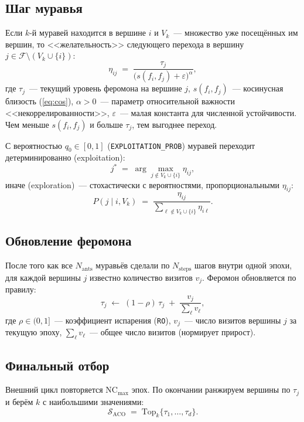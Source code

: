 \documentclass[12pt,a4paper]{article}
\begin{document}
\subsection{Шаг муравья}
Если $k$-й муравей находится в вершине $i$ и $V_k$~--- множество уже
посещённых им вершин, то <<желательность>> следующего перехода в
вершину $j \in \mathcal{F} \setminus (V_k \cup \{i\})$:
\begin{equation}
  \eta_{ij} \;=\; \frac{\tau_j}{\bigl(s(f_i, f_j) + \varepsilon\bigr)^{\alpha}},
  \label{eq:eta}
\end{equation}
где $\tau_j$~--- текущий уровень феромона на вершине $j$,
$s(f_i, f_j)$~--- косинусная близость (\ref{eq:cos}),
$\alpha > 0$~--- параметр относительной важности
<<некоррелированности>>,
$\varepsilon$~--- малая константа для численной устойчивости.
Чем меньше $s(f_i,f_j)$ и больше $\tau_j$, тем выгоднее переход.

С вероятностью $q_0 \in [0,1]$ (\texttt{EXPLOITATION\_PROB}) муравей
переходит детерминированно (exploitation):
\begin{equation}
  j^* \;=\; \arg\max_{j \notin V_k \cup \{i\}} \eta_{ij},
\end{equation}
иначе (exploration)~--- стохастически с вероятностями,
пропорциональными $\eta_{ij}$:
\begin{equation}
  P(j \mid i, V_k) \;=\;
    \frac{\eta_{ij}}{\sum_{\ell \notin V_k \cup \{i\}} \eta_{i\ell}}.
  \label{eq:explore}
\end{equation}

\subsection{Обновление феромона}
После того как все $N_{\text{ants}}$ муравьёв сделали по
$N_{\text{steps}}$ шагов внутри одной эпохи, для каждой вершины
$j$ известно количество визитов $v_j$. Феромон обновляется по правилу:
\begin{equation}
  \tau_j \;\leftarrow\; (1 - \rho)\,\tau_j \;+\; \frac{v_j}{\sum_{\ell} v_\ell},
  \label{eq:tau}
\end{equation}
где $\rho \in (0,1]$~--- коэффициент испарения (\texttt{RO}),
$v_j$~--- число визитов вершины $j$ за текущую эпоху,
$\sum_\ell v_\ell$~--- общее число визитов (нормирует прирост).

\subsection{Финальный отбор}
Внешний цикл повторяется $\text{NC}_{\max}$ эпох. По окончании
ранжируем вершины по $\tau_j$ и берём $k$ с наибольшими значениями:
\begin{equation}
  \mathcal{S}_{\text{ACO}} \;=\; \mathrm{Top}_k\!\bigl\{\tau_1, \dots, \tau_d\bigr\}.
\end{equation}
\end{document}

